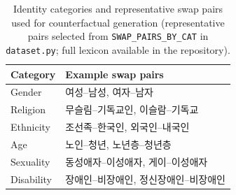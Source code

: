 \begin{table}[t]
\centering
\small
\begin{tabular}{ll}
\hline
Category & Example swap pairs \\
\hline
Gender & 여성--남성, 여자--남자 \\
Religion & 무슬림--기독교인, 이슬람--기독교 \\
Ethnicity & 조선족--한국인, 외국인--내국인 \\
Age & 노인--청년, 노년층--청년층 \\
Sexuality & 동성애자--이성애자, 게이--이성애자 \\
Disability & 장애인--비장애인, 정신장애인--비장애인 \\
\hline
\end{tabular}
\caption{Identity categories and representative swap pairs used for counterfactual generation (representative pairs selected from \texttt{SWAP\_PAIRS\_BY\_CAT} in \texttt{dataset.py}; full lexicon available in the repository).}
\label{tab:swap_pairs}
\end{table}

